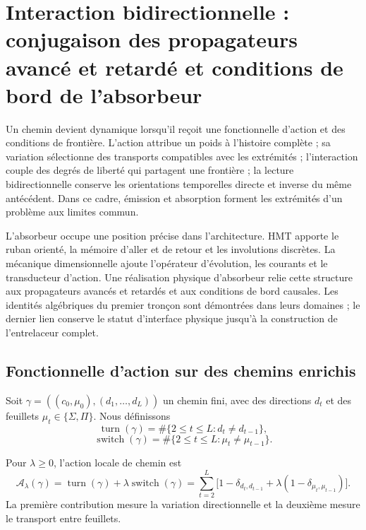 \chapter{Interaction bidirectionnelle : conjugaison des propagateurs avancé et retardé et conditions de bord de l'absorbeur}
\label{chap:mt-accion-interaccion-absorbedor}

Un chemin devient dynamique lorsqu'il reçoit une fonctionnelle d'action et des
conditions de frontière. L'action attribue un poids à l'histoire complète ; sa
variation sélectionne des transports compatibles avec les extrémités ;
l'interaction couple des degrés de liberté qui partagent une frontière ; la lecture
bidirectionnelle conserve les orientations temporelles directe et inverse du
même antécédent. Dans ce cadre, émission et absorption forment les extrémités d'un
problème aux limites commun.

L'absorbeur occupe une position précise dans l'architecture. HMT apporte le
ruban orienté, la mémoire d'aller et de retour et les involutions discrètes.
La mécanique dimensionnelle ajoute l'opérateur d'évolution, les courants et le
transducteur d'action. Une réalisation physique d'absorbeur relie cette
structure aux propagateurs avancés et retardés et aux conditions de
bord causales. Les identités algébriques du premier tronçon sont
démontrées dans leurs domaines ; le dernier lien conserve le statut
d'interface physique jusqu'à la construction de l'entrelaceur complet.

\section{Fonctionnelle d'action sur des chemins enrichis}

Soit $\gamma=((c_0,\mu_0),(d_1,\ldots,d_L))$ un chemin fini, avec des directions
$d_t$ et des feuillets $\mu_t\in\{\Sigma,\Pi\}$. Nous définissons
\[
 \operatorname{turn}(\gamma)
 =\#\{2\leq t\leq L:d_t\neq d_{t-1}\},
\]
\[
 \operatorname{switch}(\gamma)
 =\#\{2\leq t\leq L:\mu_t\neq\mu_{t-1}\}.
\]

\begin{definicionnarrativa}[title={Action discrète d'interaction minimale}]
\label{def:mt-accion-minima}
Pour $\lambda\geq0$, l'action locale de chemin est
\begin{equation}
 \mathcal A_\lambda(\gamma)
 =\operatorname{turn}(\gamma)
 +\lambda\operatorname{switch}(\gamma)
 =\sum_{t=2}^{L}
 \bigl[1-\delta_{d_t,d_{t-1}}
 +\lambda(1-\delta_{\mu_t,\mu_{t-1}})\bigr].
 \label{eq:mt-accion-minima}
\end{equation}
La première contribution mesure la variation directionnelle et la deuxième mesure le
transport entre feuillets.
\end{definicionnarrativa}

